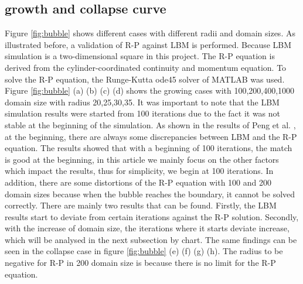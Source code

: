 \documentclass[review]{elsarticle}
\begin{document}
\subsection{growth and collapse curve}
Figure \ref{fig:bubble} shows different cases with different radii and domain sizes. As illustrated before, a validation of R-P against LBM is performed. Because LBM simulation is a two-dimensional square in this project. The R-P equation is derived from the cylinder-coordinated continuity and momentum equation. To solve the R-P equation, the Runge-Kutta ode45 solver of MATLAB was used. Figure \ref{fig:bubble} (a) (b) (c) (d) shows the growing cases with 100,200,400,1000 domain size with radius 20,25,30,35. It was important to note that the LBM simulation results were started from 100 iterations due to the fact it was not stable at the beginning of the simulation. As shown in the results of Peng et al. \cite{peng2019simulation}, at the beginning, there are always some discrepancies between LBM and the R-P equation. The results showed that with a beginning of 100 iterations, the match is good at the beginning, in this article we mainly focus on the other factors which impact the results, thus for simplicity, we begin at 100 iterations.  In addition, there are some distortions of the R-P equation with 100 and 200 domain sizes because when the bubble reaches the boundary, it cannot be solved correctly. There are mainly two results that can be found. Firstly, the LBM results start to deviate from certain iterations against the R-P solution. Secondly, with the increase of domain size, the iterations where it starts deviate increase, which will be analysed in the next subsection by chart. The same findings can be seen in the collapse case in figure \ref{fig:bubble} (e) (f) (g) (h). The radius to be negative for R-P in 200 domain size is because there is no limit for the R-P equation. 
\end{document}
